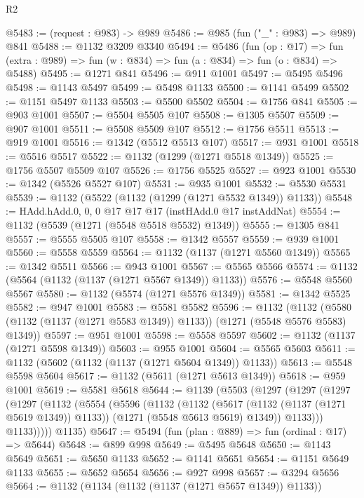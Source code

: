 \begin{lexlean}{R2}
\begin{coremodule}
@5483 := (request : @983) -> @989
@5486 := @985 (fun ("_" : @983) => @989) @841
@5488 := @1132 @3209 @3340
@5494 := @5486
    (fun (op : @17) =>
    fun (extra : @989) => fun (w : @834) => fun (a : @834) => fun (o : @834) => @5488)
@5495 := @1271 @841
@5496 := @911 @1001
@5497 := @5495 @5496
@5498 := @1143 @5497
@5499 := @5498 @1133
@5500 := @1141 @5499
@5502 := @1151 @5497 @1133
@5503 := @5500 @5502
@5504 := @1756 @841
@5505 := @903 @1001
@5507 := @5504 @5505 @107
@5508 := @1305 @5507
@5509 := @907 @1001
@5511 := @5508 @5509 @107
@5512 := @1756 @5511
@5513 := @919 @1001
@5516 := @1342 (@5512 @5513 @107)
@5517 := @931 @1001
@5518 := @5516 @5517
@5522 := @1132 (@1299 (@1271 @5518 @1349))
@5525 := @1756 @5507 @5509 @107
@5526 := @1756 @5525
@5527 := @923 @1001
@5530 := @1342 (@5526 @5527 @107)
@5531 := @935 @1001
@5532 := @5530 @5531
@5539 := @1132 (@5522 (@1132 (@1299 (@1271 @5532 @1349)) @1133))
@5548 := HAdd.hAdd.{0, 0, 0} @17 @17 @17 (instHAdd.{0} @17 instAddNat)
@5554 := @1132 (@5539 (@1271 (@5548 @5518 @5532) @1349))
@5555 := @1305 @841
@5557 := @5555 @5505 @107
@5558 := @1342 @5557
@5559 := @939 @1001
@5560 := @5558 @5559
@5564 := @1132 (@1137 (@1271 @5560 @1349))
@5565 := @1342 @5511
@5566 := @943 @1001
@5567 := @5565 @5566
@5574 := @1132 (@5564 (@1132 (@1137 (@1271 @5567 @1349)) @1133))
@5576 := @5548 @5560 @5567
@5580 := @1132 (@5574 (@1271 @5576 @1349))
@5581 := @1342 @5525
@5582 := @947 @1001
@5583 := @5581 @5582
@5596 := @1132
    (@1132 (@5580 (@1132 (@1137 (@1271 @5583 @1349)) @1133)) (@1271 (@5548 @5576 @5583) @1349))
@5597 := @951 @1001
@5598 := @5558 @5597
@5602 := @1132 (@1137 (@1271 @5598 @1349))
@5603 := @955 @1001
@5604 := @5565 @5603
@5611 := @1132 (@5602 (@1132 (@1137 (@1271 @5604 @1349)) @1133))
@5613 := @5548 @5598 @5604
@5617 := @1132 (@5611 (@1271 @5613 @1349))
@5618 := @959 @1001
@5619 := @5581 @5618
@5644 := @1139
    (@5503
      (@1297
        (@1297
          (@1297
            (@1297
              (@1132
                (@5554
                  (@5596
                    (@1132
                      (@1132
                        (@5617 (@1132 (@1137 (@1271 @5619 @1349)) @1133))
                        (@1271 (@5548 @5613 @5619) @1349))
                      @1133)))
                @1133)))))
      @1135)
@5647 := @5494 (fun (plan : @889) => fun (ordinal : @17) => @5644)
@5648 := @899 @998
@5649 := @5495 @5648
@5650 := @1143 @5649
@5651 := @5650 @1133
@5652 := @1141 @5651
@5654 := @1151 @5649 @1133
@5655 := @5652 @5654
@5656 := @927 @998
@5657 := @3294 @5656
@5664 := @1132 (@1134 (@1132 (@1137 (@1271 @5657 @1349)) @1133))

\end{coremodule}
\end{lexlean}
